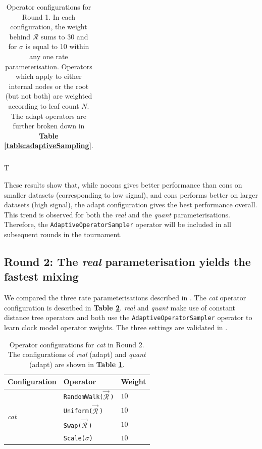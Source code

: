 \documentclass[10pt,letterpaper]{article}
\begin{document}
\begin{table}[h!]
\begin{tabular}{|l l l l|}
\end{tabular}
\caption{Operator configurations for Round 1. In each configuration, the weight behind $\mathcal{R}$ sums to 30 and for $\sigma$ is equal to 10 within any one rate parameterisation. 
Operators which apply to either internal nodes or the root (but not both) are weighted according to leaf count $N$. The adapt operators are further broken down in \textbf{Table \ref{table:adaptiveSampling}}.} 
T%
\label{table:round1Results}
\end{table}




These results show that, while nocons gives better performance than cons on smaller datasets (corresponding to low signal), and cons performs better on larger datasets (high signal), the adapt configuration gives the best performance overall.
This trend is observed for both the \textit{real} and the \textit{quant} parameterisations.
Therefore, the \texttt{AdaptiveOperatorSampler} operator will be included in all subsequent rounds in the tournament. 





\clearpage
\subsection*{Round 2: The \textit{real} parameterisation yields the fastest mixing }

We compared the three rate parameterisations described in \textbf{}. 
The \textit{cat} operator configuration is described in \textbf{Table \ref{table:round2Results}}.
\textit{real} and \textit{quant} make use of constant distance tree operators \cite{zhang2020improving} and both use the \texttt{AdaptiveOperatorSampler} operator to learn clock model operator weights.
The three settings are validated in \textbf{}.




\begin{table}[h!]
\centering
\begin{tabular}{|l l l|} 
 \hline
Configuration & Operator & Weight  \\
  \hline
 \multirow{4}{*}{\textit{cat}} 
 	& \texttt{RandomWalk($\vec{\mathcal{R}}^{\,}$)} & $10$ \\
 	& \texttt{Uniform($\vec{\mathcal{R}}^{\,}$)} & $10$  \\ 
 	& \texttt{Swap($\vec{\mathcal{R}}^{\,}$)} & $10$ \\ 
 	& \texttt{Scale($\sigma$)} & $10$ \\ 
  \hline
\end{tabular}
\caption{Operator configurations for \textit{cat} in Round 2. The configurations of \textit{real} (adapt) and \textit{quant} (adapt) are shown in \textbf{Table \ref{table:round1Results}}.}
\label{table:round2Results}
\end{table}
\end{document}
